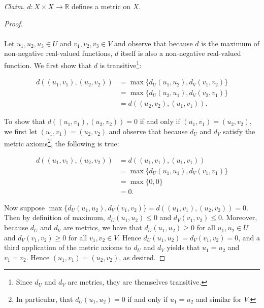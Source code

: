     \emph{Claim.} $d:X \times X \to \mathbb{R}$ defines a metric on $X$.
    \ \\

    \begin{proof}\ \\\\
        Let $u_1, u_2, u_3 \in U$ and $v_1, v_2, v_3 \in V$ and observe that because $d$ is the maximum of non-negative
        real-valued functions, $d$ itself is also a non-negative real-valued function. We first show that $d$ is 
        transitive\footnote{
            Since $d_U$ and $d_V$ are metrics, they are themselves transitive.
        }:

        \begin{align*}
            d((u_1, v_1), (u_2, v_2)) &= \max{\{d_U(u_1, u_2), d_V(v_1, v_2)\}} \\
                                      &= \max{\{d_U(u_2, u_1), d_V(v_2, v_1)\}} \\
                                      &= d((u_2, v_2), (u_1, v_1)).
        \end{align*}

        To show that $d((u_1, v_1), (u_2, v_2)) = 0$ if and only if $(u_1, v_1) = (u_2, v_2)$, we first let
        $(u_1, v_1) = (u_2, v_2)$ and observe that because $d_U$ and $d_V$ satisfy the metric axioms\footnote{
            In particular, that $d_U(u_1, u_2) = 0$ if and only if $u_1 = u_2$ and similar for $V$.
        }, the following
        is true:
        
        \begin{align*}
            d((u_1, v_1), (u_2, v_2)) &= d((u_1, v_1), (u_1, v_1)) \\
                                      &= \max{\{d_U(u_1, u_1), d_V(v_1, v_1)\}} \\
                                      &= \max{\{0, 0\}} \\
                                      &= 0.
        \end{align*}

        Now suppose $\max{\{d_U(u_1, u_2), d_V(v_1, v_2)\}} = d((u_1, v_1), (u_2, v_2)) = 0$. Then by definition of
        maximum, $ d_U(u_1, u_2) \le 0$ and $d_V(v_1, v_2) \le 0$. Moreover, because $d_U$ and $d_V$ are metrics, we
        have that $d_U(u_1, u_2) \ge 0$ for all $u_1, u_2 \in U$ and $d_V(v_1, v_2) \ge 0$ for all $v_1, v_2 \in V$.
        Hence $d_U(u_1, u_2) = d_V(v_1, v_2) = 0$, and a third application of the metric axioms to $d_U$ and $d_V$
        yields that $u_1 = u_2$ and $v_1 = v_2$. Hence $(u_1, v_1) = (u_2, v_2)$, as desired.


\end{proof}
